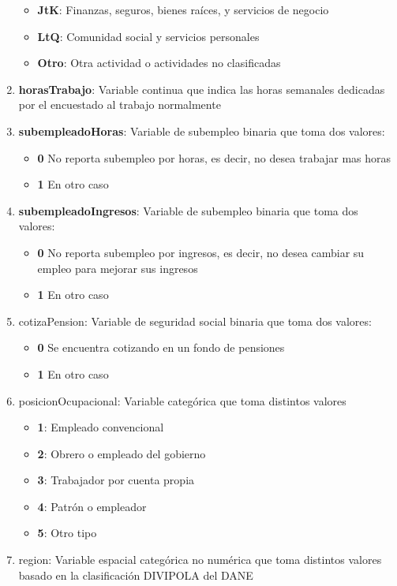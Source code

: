 \documentclass[12pt,a4paper]{article}
\begin{document}
\begin{enumerate}
\begin{itemize}
		\item \textbf{JtK}: Finanzas, seguros, bienes raíces, y servicios de negocio
		\item \textbf{LtQ}: Comunidad social y servicios personales
		\item \textbf{Otro}: Otra actividad o actividades no clasificadas
	\end{itemize}
		\item \textbf{horasTrabajo}: Variable continua que indica las horas semanales dedicadas por el encuestado al trabajo normalmente
		\item \textbf{subempleadoHoras}: Variable de subempleo binaria que toma dos valores:
		\begin{itemize}
			\item \textbf{0} No reporta subempleo por horas, es decir, no desea trabajar mas horas
			\item \textbf{1} En otro caso
		\end{itemize}
		\item \textbf{subempleadoIngresos}: Variable de subempleo binaria que toma dos valores:
		\begin{itemize}
			\item \textbf{0} No reporta subempleo por ingresos, es decir, no desea cambiar su empleo para mejorar sus ingresos
			\item \textbf{1} En otro caso
		\end{itemize}
		\item cotizaPension: Variable de seguridad social binaria que toma dos valores:
		\begin{itemize}
			\item \textbf{0} Se encuentra cotizando en un fondo de pensiones
			\item \textbf{1} En otro caso
		\end{itemize}
		\item posicionOcupacional: Variable categórica que toma distintos valores
		\begin{itemize}
			\item \textbf{1}: Empleado convencional
			\item \textbf{2}: Obrero o empleado del gobierno
			\item \textbf{3}: Trabajador por cuenta propia
			\item \textbf{4}: Patrón o empleador
			\item \textbf{5}: Otro tipo
		\end{itemize}
		\item region: Variable espacial categórica no numérica que toma distintos valores basado en la clasificación DIVIPOLA del DANE

\end{enumerate}
\end{document}
